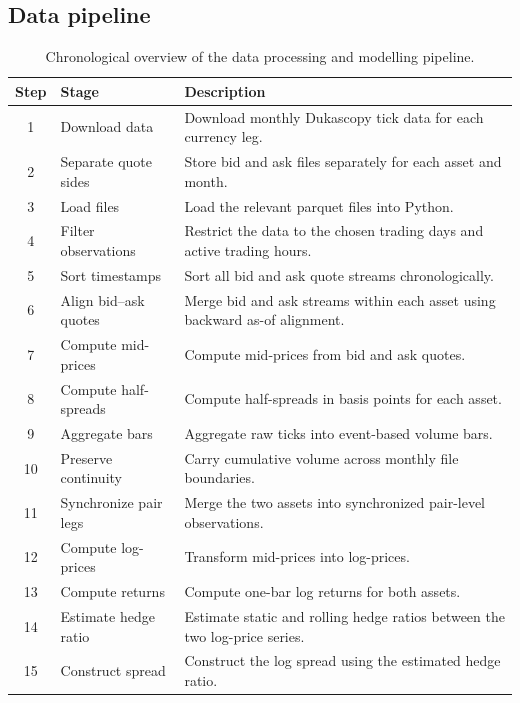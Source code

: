 
\subsection{Data pipeline}

\begin{table}[H]
\centering
\caption{Chronological overview of the data processing and modelling pipeline.}
\label{tab:data_processing_pipeline}
\small
\begin{tabularx}{\linewidth}{clX}
\toprule
\textbf{Step} & \textbf{Stage} & \textbf{Description} \\
\midrule
1  & Download data & Download monthly Dukascopy tick data for each currency leg. \\
2  & Separate quote sides & Store bid and ask files separately for each asset and month. \\
3  & Load files & Load the relevant parquet files into Python. \\
4  & Filter observations & Restrict the data to the chosen trading days and active trading hours. \\
5  & Sort timestamps & Sort all bid and ask quote streams chronologically. \\
6  & Align bid--ask quotes & Merge bid and ask streams within each asset using backward as-of alignment. \\
7  & Compute mid-prices & Compute mid-prices from bid and ask quotes. \\
8  & Compute half-spreads & Compute half-spreads in basis points for each asset. \\
9  & Aggregate bars & Aggregate raw ticks into event-based volume bars. \\
10 & Preserve continuity & Carry cumulative volume across monthly file boundaries. \\
11 & Synchronize pair legs & Merge the two assets into synchronized pair-level observations. \\
12 & Compute log-prices & Transform mid-prices into log-prices. \\
13 & Compute returns & Compute one-bar log returns for both assets. \\
14 & Estimate hedge ratio & Estimate static and rolling hedge ratios between the two log-price series. \\
15 & Construct spread & Construct the log spread using the estimated hedge ratio. \\

\end{tabularx}
\end{table}
